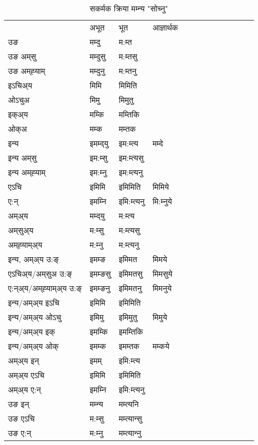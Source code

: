 \begin{table}[H]
\centering
\caption{\label{imt.vt} सकर्मक क्रिया  मम्‍न्य  "सोच्नु"  }
\begin{tabular}{l|l|l|l|l|l|l|l|l|l|l|l|l}  \toprule
&अभूत & भूत & आज्ञार्थक \\ 
उङ &मम्दु &म:म्त \\ 
उङ अम्‌सु&मम्दुसु &म:म्तसु \\ 
उङ अम्‌ह्‍याम्&मम्दुनु &म:म्तनु \\ 
इऽचिअ्य &मिमि &मिमिति   \\ 
ओऽचुअ        &मिमु &मिमुतु   \\ 
इक्अ्य&मम्कि &मम्तिकि   \\ 
ओक्अ &मम्क &मम्तक   \\ 
इन्य & इमम्द्‌यु  & इम:म्त्य &मम्दे  \\ 
इन्य अम्‌सु& इम:म्सु  & इम:म्त्यसु   \\ 
इन्य अम्‌ह्‍याम्& इम:म्‍नु  & इम:म्त्यनु   \\ 
एऽचि & इमिमि & इमिमिति &मिमिये    \\ 
ए:न् & इमम्‍नि  & इमि:म्त्यनु &मि:म्‍नुये  \\ 
अम्अ्य & मम्द्‌यु  & म:म्त्य  \\ 
अम्‌सुअ्य & म:म्सु & म:म्त्यसु  \\ 
अम्‌ह्‍याम्अ्य & म:म्‍नु  & म:म्त्यनु \\ 
\midrule
इन्य, अम्अ्य उ:ङ्‌ &इमम्ङ &इमिमत &मिमये \\ 
एऽचिअ्य/अम्‌सुअ उ:ङ्‌ &इमम्ङसु &इमिमतसु &मिमसुये \\ 
ए:न्अ्य/अम्‌ह्‍याम्अ्य उ:ङ्‌ &इमम्ङनु &इमिमतनु &मिमनुये \\ 
इन्य/अम्अ्य इऽचि &इमिमि &इमिमिति    \\ 
इन्य/अम्अ्य ओऽचु &इमिमु &इमिमुतु  &मिमुये  \\ 
इन्य/अम्अ्य इक् &इमम्कि &इमम्तिकि   \\ 
इन्य/अम्अ्य ओक् &इमम्क &इमम्तक  &मम्कये  \\ 
अम्अ्य इन् & इमम् & इमि:म्त्य   \\ 
अम्अ्य एऽचि & इमिमि & इमिमिति    \\ 
अम्अ्य ए:न् & इमम्‍नि  & इमि:म्त्यनु  \\ 
\midrule
उङ इन् & मम्‍न्य  & मम्त्यनि  \\ 
उङ एऽचि & म:म्सु  & मम्त्यान्सु   \\ 
उङ ए:न्& म:म्‍नु  & मम्त्यान्‍नु   \\ 
\bottomrule
\end{tabular}
\end{table}


